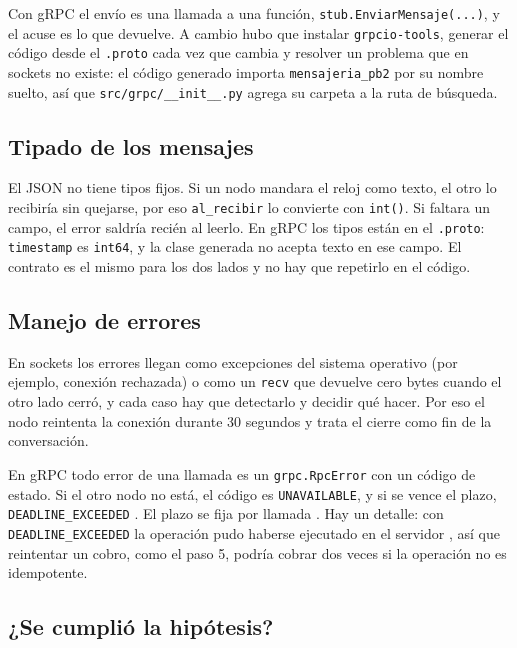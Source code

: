 \documentclass[11pt,a4paper]{article}
\begin{document}
Con gRPC el envío es una llamada a una función, \texttt{stub.EnviarMensaje(...)}, y el acuse es lo que devuelve. A cambio hubo que instalar \texttt{grpcio-tools}, generar el código desde el \texttt{.proto} cada vez que cambia y resolver un problema que en sockets no existe: el código generado importa \texttt{mensajeria\_pb2} por su nombre suelto, así que \texttt{src/grpc/\_\_init\_\_.py} agrega su carpeta a la ruta de búsqueda.

\subsection{Tipado de los mensajes}

El JSON no tiene tipos fijos. Si un nodo mandara el reloj como texto, el otro lo recibiría sin quejarse, por eso \texttt{al\_recibir} lo convierte con \texttt{int()}. Si faltara un campo, el error saldría recién al leerlo. En gRPC los tipos están en el \texttt{.proto}: \texttt{timestamp} es \texttt{int64}, y la clase generada no acepta texto en ese campo. El contrato es el mismo para los dos lados y no hay que repetirlo en el código.

\subsection{Manejo de errores}

En sockets los errores llegan como excepciones del sistema operativo (por ejemplo, conexión rechazada) o como un \texttt{recv} que devuelve cero bytes cuando el otro lado cerró, y cada caso hay que detectarlo y decidir qué hacer. Por eso el nodo reintenta la conexión durante 30 segundos y trata el cierre como fin de la conversación.

En gRPC todo error de una llamada es un \texttt{grpc.RpcError} con un código de estado. Si el otro nodo no está, el código es \texttt{UNAVAILABLE}, y si se vence el plazo, \texttt{DEADLINE\_EXCEEDED} \cite{grpc_estados}. El plazo se fija por llamada \cite{grpc_conceptos}. Hay un detalle: con \texttt{DEADLINE\_EXCEEDED} la operación pudo haberse ejecutado en el servidor \cite{grpc_estados}, así que reintentar un cobro, como el paso 5, podría cobrar dos veces si la operación no es idempotente.

\subsection{¿Se cumplió la hipótesis?}
\end{document}

